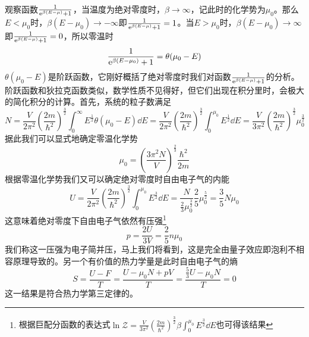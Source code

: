 \documentclass[../../main.tex]{subfiles}
\begin{document}
观察函数\(\frac{1}{\mathrm{e}^{\beta(E-\mu)}+1}\)，当温度为绝对零度时，\(\beta\to\infty\)，记此时的化学势为\(\mu_0\)。那么\(E<\mu_0\)时，\({\beta(E-\mu_0)}\to-\infty\)即\(\frac{1}{\mathrm{e}^{\beta(E-\mu)}+1}=1\)。当\(E>\mu_0\)时，\({\beta(E-\mu_0)}\to\infty\)即\(\frac{1}{\mathrm{e}^{\beta(E-\mu)}+1}=0\)，所以零温时
\begin{equation}
    \frac{1}{\mathrm{e}^{\beta(E-\mu_0)}+1}=\theta(\mu_0-E)
\end{equation}
\(\theta(\mu_0-E)\)是阶跃函数，它刚好概括了绝对零度时我们对函数\(\frac{1}{\mathrm{e}^{\beta(E-\mu)}+1}\)的分析。阶跃函数和狄拉克函数类似，数学性质不见得好，但它们出现在积分里时，会极大的简化积分的计算。首先，系统的粒子数满足
\begin{equation}
    N=\frac{V}{2\pi^2}\left(\frac{2m}{\hbar^2}\right)^{\frac{3}{2}}\int_0^{\infty}E^{\frac{1}{2}}\theta(\mu_0-E)\dd E=\frac{V}{2\pi^2}\left(\frac{2m}{\hbar^2}\right)^{\frac{3}{2}}\int_0^{\mu_0}E^{\frac{1}{2}}\dd E=\frac{V}{3\pi^2}\left(\frac{2m}{\hbar^2}\right)^{\frac{3}{2}}\mu_0^\frac{3}{2}
\end{equation}
据此我们可以显式地确定零温化学势
\begin{equation}
    \mu_0=\left(\frac{3\pi^2N}{V}\right)^{\frac{2}{3}}\frac{\hbar^2}{2m}
\end{equation}
根据零温化学势我们又可以确定绝对零度时自由电子气的内能
\begin{equation}
    U=\frac{V}{2\pi^2}\left(\frac{2m}{\hbar^2}\right)^{\frac{3}{2}}\int_0^{\mu_0}E^{\frac{3}{2}}\dd E=\frac{N}{\frac{2}{3}\mu_0^{\frac{3}{2}}}\frac{2}{5}\mu_0^{\frac{5}{2}}=\frac{3}{5}N\mu_0
\end{equation}
这意味着绝对零度下自由电子气依然有压强\footnote{根据巨配分函数的表达式\(\displaystyle \ln\mathcal{Z}=\frac{V}{3\pi^2}\left(\frac{2m}{\hbar^2}\right)^{\frac{3}{2}}\beta\int_0^{\mu_0}E^{\frac{3}{2}}\dd E\)也可得该结果}
\begin{equation}
    p=\frac{2U}{3V}=\frac{2}{5}n\mu_0
\end{equation}
我们称这一压强为电子简并压，马上我们将看到，这是完全由量子效应即泡利不相容原理导致的。另一个有价值的热力学量是此时自由电子气的熵
\begin{equation}
    S=\frac{U-F}{T}=\frac{U-\mu_0N+pV}{T}=\frac{\frac{5}{3}U-\mu_0N}{T}=0
\end{equation}
这一结果是符合热力学第三定律的。
\end{document}

